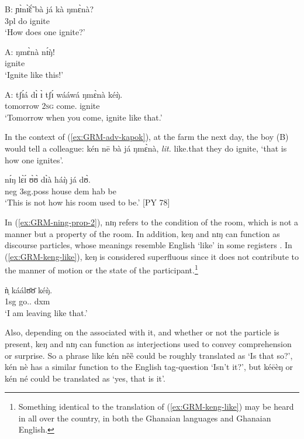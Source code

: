 \begin{exe}
\begin{exe}
\begin{exe}
\begin{exe}
\begin{exe}
\begin{exe}
\begin{exe}
\begin{exe}
\begin{exe}
\begin{exe}
\begin{exe}
\begin{exe}
 \ex\label{ex:GRM-adv-kapok-B}
\gll B:  ɲɪ̀nɪ̃̀ɛ̃́ bà já kà ŋmɛ̀nà?\\
{} {\q} {\sc 3pl} do {\egr} ignite\\
\glt `How does one ignite?' 

 \ex\label{ex:GRM-adv-kapok-A-2}
\gll  A: ŋmɛ̀nà nɪ́ŋ̀!\\
{} ignite {\dxm}\\
\glt `Ignite like this!'

 \ex\label{ex:GRM-adv-kapok-A-3}
 \gll  A: tʃɪ́á dɪ̀ ɪ̀ tʃɪ́ wááwá ŋmɛ̀nà kéŋ̀.\\
{} tomorrow {\conn} \textsc{2sg} {\cras} come.{\pfv} ignite {\dxm}\\
\glt `Tomorrow when you come, ignite like that.'
 
\z 
 \z  
 
In the context of (\ref{ex:GRM-adv-kapok}), at the farm the next day, the boy (B) would tell a colleague: {\sls  kén nē bà já ŋmɛ̀nà},  {\it lit.} like.that they do ignite, `that is how one ignites'. 


\ea\label{ex:GRM-ning-prop-2}
 \gll nɪ́ŋ lɛ̀ɪ́ ʊ̀ʊ̀ dɪ̀à háŋ̀ já dʊ̀.\\
 {\dxm} {\sc neg}  {\sc 3sg.poss} house {\sc dem} {\sc hab} be\\
\glt  `This is not how his room used to be.' [PY 78]

\z


In (\ref{ex:GRM-ning-prop-2}), {\sls nɪŋ} refers to the condition of  the room,
which is not a manner  but a property of the room. 
In addition, {\sls keŋ} and 
{\sls nɪŋ} can function as  discourse particles, whose
meanings resemble   English `like' in some registers \citep{Muff02}. In
(\ref{ex:GRM-keng-like}), {\sls keŋ} is considered superfluous since it does not
contribute to the manner of  motion or the state of the
participant.\footnote{Something identical to the translation of
(\ref{ex:GRM-keng-like}) may be heard in all over the country, in both the Ghanaian languages and Ghanaian English.} 
 
 \ea\label{ex:GRM-keng-like} 
 \gll ǹ̩ káálʊ̄ʊ̄ kéŋ̀.\\
 {\sc 1sg} go.{\ipfv .\foc}  {\sc dxm}\\
 \glt `I am leaving like that.'
\z

Also, depending on the  associated with it, and whether or not  the  particle  is  present, {\sls keŋ} and {\sls nɪŋ} can function as  interjections used to convey comprehension or surprise. So a phrase like {\sls kén nȅȅ} could be roughly translated as `Is that so?', {\sls kén nè}   has a similar function to the English  tag-question `Isn't it?', but {\sls kéēèŋ} or {\sls kén{\ꜜ} né} could be translated as `yes, that is it'. 


\end{exe}
\end{exe}
\end{exe}
\end{exe}
\end{exe}
\end{exe}
\end{exe}
\end{exe}
\end{exe}
\end{exe}
\end{exe}
\end{exe}
